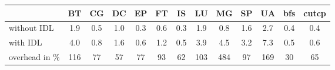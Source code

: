 \begin{table}[t]
\centering
\begin{tabular}{lcccccccccccc}
  \toprule
  & \hspace{0.17mm}BT\hspace{0.17mm}
  & \hspace{0.17mm}CG\hspace{0.17mm}
  & \hspace{0.17mm}DC\hspace{0.17mm}
  & \hspace{0.17mm}EP\hspace{0.17mm}
  & \hspace{0.17mm}FT\hspace{0.17mm}
  & \hspace{0.17mm}IS\hspace{0.17mm}
  & \hspace{0.17mm}LU\hspace{0.17mm}
  & \hspace{0.17mm}MG\hspace{0.17mm}
  & \hspace{0.17mm}SP\hspace{0.17mm}
  & \hspace{0.17mm}UA\hspace{0.17mm}
  & \hspace{0.17mm}bfs\hspace{0.17mm}
  & \hspace{0.17mm}cutcp\hspace{0.17mm} \\
  \midrule
without IDL    & 1.9 & 0.5 & 1.0 & 0.3 & 0.6 & 0.3 & 1.9 & 0.8 & 1.6 & 2.7 & 0.4 & 0.4 \\[0.25em]
with IDL       & 4.0 & 0.8 & 1.6 & 0.6 & 1.2 & 0.5 & 3.9 & 4.5 & 3.2 & 7.3 & 0.5 & 0.6 \\[0.75em]
overhead in \% & 116 &  77 &  57 &  77 &  93 &  62 & 103 & 484 &  97 & 169 &  30 &  65 \\
  \bottomrule
\end{tabular}
\vspace{5mm}


\end{table}
